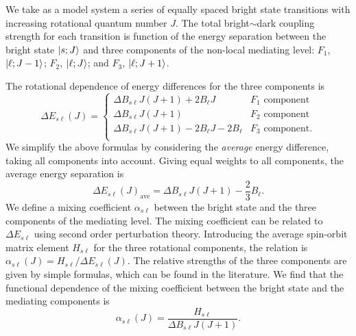 \documentclass[12pt]{mitthesis}
\begin{document}
We take as a model system a series of equally spaced bright state
transitions with increasing rotational quantum number $J$.  The total
bright$\sim$dark coupling strength for each transition is function of
the energy separation between the bright state $\mathinner{|{s;J}\rangle}$ and three
components of the non-local mediating level: $F_1$, $\mathinner{|{\ell;J-1}\rangle}$;
$F_2$, $\mathinner{|{\ell;J}\rangle}$; and $F_3$, $\mathinner{|{\ell;J+1}\rangle}$.

The rotational dependence of energy differences for the three
components is
\begin{equation}
  \Delta E_{s\ell}(J) = 
  \begin{cases}
    \Delta B_{s\ell}J(J+1) + 2B_{\ell}J           & F_1 \text{ component}\\
    \Delta B_{s\ell}J(J+1)                      & F_2 \text{ component}\\
    \Delta B_{s\ell}J(J+1) - 2B_{\ell}J - 2B_{\ell} & F_3 \text{ component}.\\
  \end{cases}
\end{equation}
We simplify the above formulas by considering the \emph{average}
energy difference, taking all components into account.  Giving equal
weights to all components, the average energy separation is
\begin{equation}
  \Delta E_{s\ell}(J)_{\text{ave}} = \Delta B_{s\ell}J(J+1) - \frac{2}{3}B_{\ell}.
\end{equation}
We define a mixing coefficient $\alpha_{s\ell}$ between the bright
state and the three components of the mediating level.  The mixing
coefficient can be related to $\Delta E_{s\ell}$ using second order
perturbation theory.  Introducing the average spin-orbit matrix
element $H_{s\ell}$ for the three rotational components, the relation
is $\alpha_{s\ell}(J) = H_{s\ell} / \Delta E_{s\ell}(J)$.  The
relative strengths of the three components are given by simple
formulas, which can be found in the literature.  We find that the
functional dependence of the mixing coefficient between the bright
state and the mediating components is
\begin{equation}
  \alpha_{s\ell}(J) = \frac{H_{s\ell}}{\Delta B_{s\ell}J(J+1)}.
\end{equation}
\end{document}
